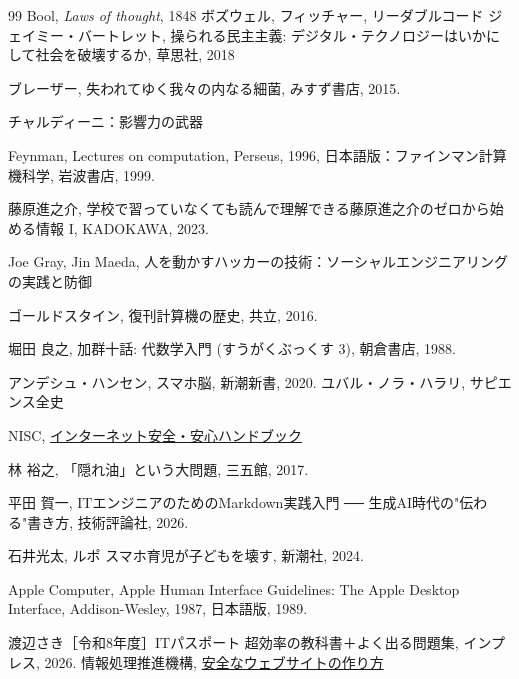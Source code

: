 \documentclass[book, paper=a4paper, 11pt]{jlreq}
\theoremstyle{definition}
\theoremstyle{remark}
\begin{document}
\begin{thebibliography}{99}
      Bool, {\em Laws of thought}, 1848
      ボズウェル, フィッチャー, リーダブルコード
         ジェイミー・バートレット, 
         操られる民主主義: デジタル・テクノロジーはいかにして社会を破壊するか, 
         草思社, 2018

      ブレーザー, 失われてゆく我々の内なる細菌, みすず書店, 2015.

      チャルディーニ：影響力の武器

      Feynman, Lectures on computation, Perseus, 1996, 
      日本語版：ファインマン計算機科学, 岩波書店, 1999.


      藤原進之介, 
      学校で習っていなくても読んで理解できる藤原進之介のゼロから始める情報 I, 
      KADOKAWA, 2023. 

       Joe Gray, Jin Maeda,
      人を動かすハッカーの技術：ソーシャルエンジニアリングの実践と防御 

      ゴールドスタイン, 復刊計算機の歴史, 共立, 2016.

      堀田 良之, 加群十話: 代数学入門 (すうがくぶっくす 3), 朝倉書店, 1988.
 
      アンデシュ・ハンセン, スマホ脳, 新潮新書, 2020.
      ユバル・ノラ・ハラリ, サピエンス全史
      
      NISC,
      \href{https://security-portal.cyber.go.jp/guidance/handbook.html}
      {インターネット安全・安心ハンドブック} 
   
      林 裕之, 「隠れ油」という大問題, 三五館, 2017.
      
      平田 賀一, 
      ITエンジニアのためのMarkdown実践入門 ── 生成AI時代の"伝わる"書き方, 
      技術評論社, 2026.

      石井光太, ルポ スマホ育児が子どもを壊す, 新潮社, 2024.
   
      Apple Computer, 
      Apple Human Interface Guidelines: 
      The Apple Desktop Interface, Addison-Wesley, 1987,
      日本語版, 1989.


      渡辺さき［令和8年度］ITパスポート 超効率の教科書＋よく出る問題集, インプレス, 2026.
       情報処理推進機構, 
       \href{https://www.ipa.go.jp/security/vuln/websecurity/about.html}{安全なウェブサイトの作り方}


\end{thebibliography}
\end{document}
